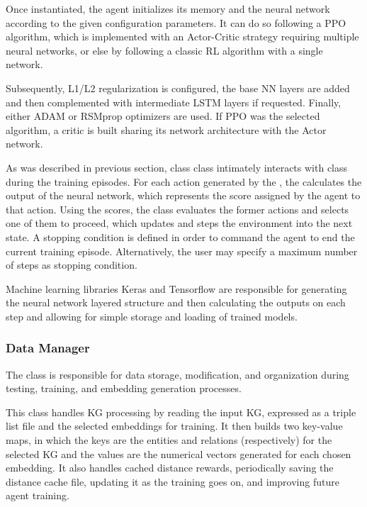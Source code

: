 Once instantiated, the agent initializes its memory and the neural network according to the given configuration parameters. It can do so following a PPO algorithm, which is implemented with an Actor-Critic strategy requiring multiple neural networks, or else by following a classic RL algorithm with a single network.

Subsequently, L1/L2 regularization is configured, the base NN layers are added and then complemented with intermediate LSTM layers 
 if requested. Finally, either ADAM 
 or RSMprop 
 optimizers are used. If PPO was the selected algorithm, a critic is built sharing its network architecture with the Actor network.

As was described in previous section, class  class intimately interacts with class  during the training episodes. For each action generated by the , the  calculates the output of the neural network, which represents the score assigned by the agent to that action. Using the scores, the  class evaluates the former actions and selects one of them to proceed, which updates and steps the environment into the next state.
A stopping condition is defined in order to command the agent to end the current training episode. Alternatively, the user may specify a maximum number of steps as stopping condition.  

Machine learning libraries Keras 
and Tensorflow
are responsible for generating the neural network layered structure and then calculating the outputs on each step and allowing for simple storage and loading of trained models.

\subsubsection{Data Manager}
The  class is responsible for data storage, modification, and organization during testing, training, and embedding generation processes. 

This class handles KG processing by reading the input KG, expressed as a triple list file and the selected embeddings for training. It then builds two key-value maps, in which the keys are the entities and relations (respectively) for the selected KG and the values are the numerical vectors generated for each chosen embedding. It also handles cached distance rewards, periodically saving the distance cache file, updating it as the training goes on, and improving future agent training.

